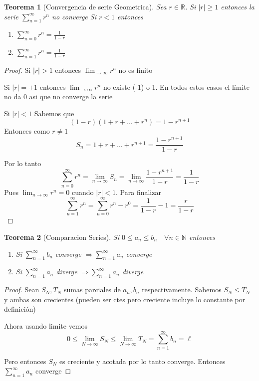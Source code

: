 \documentclass{article}
\theoremstyle{break}
\newtheorem{theorem}{Teorema}[section]
\begin{document}
\begin{theorem}[Convergencia de serie Geometrica]
	Sea $r\in \mathbb{R}$. Si $|r|\geq 1$ entonces la serie $\sum_{n=1}^{\infty}r^n$ no converge
	Si $r<1$ entonces
	\begin{enumerate}
		\item $\sum_{n=0}^{\infty}r^n = \frac{1}{1-r}$
		\item $\sum_{n=1}^{\infty}r^n = \frac{1}{1-r}$
	\end{enumerate}
\end{theorem}
\begin{proof}
	Si $|r|> 1$ entonces $\lim_{ \rightarrow \infty }r^n$ no es finito   

	Si $|r|= \pm 1$ entonces $\lim_{ \rightarrow \infty }r^n$ no existe (-1) o 1.
	En todos estos casos el límite no da 0 asi que no converge la serie
	
	Si $|r| < 1$
	Sabemos que \[ (1-r)(1+r+\ldots + r^n) = 1- r^{n+1} \]
	Entonces como $r\neq 1$\[ S_n= 1+r+\ldots+r^{n+1} =  \frac{1-r^{n+1}}{1-r}\]

	Por lo tanto \[ \sum_{n=0}^{\infty} r^n = \lim_{n \rightarrow \infty} S_n = 
	\lim_{n \rightarrow \infty } \frac{1-r^{n+1}}{1-r} =\frac{1}{1-r} \]
	Pues $\lim_{n \rightarrow \infty }r^n = 0$ cuando $|r|<1$. Para finalizar
	\[ \sum_{n=1}^{\infty}r^n = \sum_{n=0}^{\infty}r^n - r^0 = \frac{1}{1-r}-1 = \frac{r}{1-r}\]
\end{proof}

\begin{theorem}[Comparacion Series]
	Si $0\leq a_n \leq b_n \quad \forall n\in \mathbb{N}$ entonces
	\begin{enumerate}
		\item Si $\sum_{n=1}^{\infty} b_n$ converge $\Longrightarrow \sum_{n=1}^{\infty}a_n$ converge
		\item Si $\sum_{n=1}^{\infty} a_n$ diverge $\Longrightarrow \sum_{n=1}^{\infty}a_n$ diverge
	\end{enumerate}
\end{theorem}
\begin{proof}
	Sean $S_N, T_N$ sumas parciales de $a_n,b_n$ respectivamente. Sabemos $S_N \leq T_N$ y ambas 
	son crecientes (pueden ser ctes pero creciente incluye lo constante por definición)

	Ahora usando limite vemos
	\[ 0 \leq \lim_{N \rightarrow \infty }S_N \leq \lim_{N \rightarrow \infty }T_N = 
	\sum_{n=1}^{\infty}b_n = \ell \]

	Pero entonces $S_N$ es creciente y acotada por lo tanto converge. 
	Entonces $\sum_{n=1}^{\infty}a_n$ converge

\end{proof}
\end{document}
